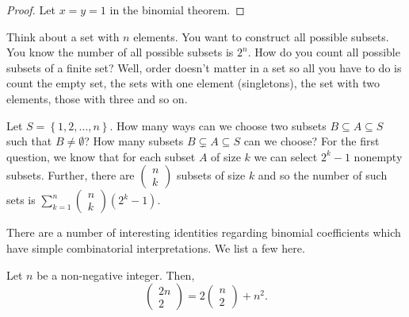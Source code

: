 \begin{proof}
Let $x=y=1$ in the binomial theorem.
\end{proof}
\begin{rem*}
Think about a set with $n$ elements. You want to construct all possible
subsets. You know the number of all possible subsets is $2^{n}$.
How do you count all possible subsets of a finite set? Well, order
doesn't matter in a set so all you have to do is count the empty set,
the sets with one element (singletons), the set with two elements,
those with three and so on.
\end{rem*}
\begin{example}
\label{exa:isi2013psb3}Let $S=\left\{ 1,2,\ldots,n\right\} .$ How
many ways can we choose two subsets $B\subseteq A\subseteq S$ such
that $B\neq\emptyset$? How many subsets $B\subsetneq A\subseteq S$
can we choose? For the first question, we know that for each subset
$A$ of size $k$ we can select $2^{k}-1$ nonempty subsets. Further,
there are $\left(\begin{array}{c}
n\\
k
\end{array}\right)$ subsets of size $k$ and so the number of such sets is $\sum_{k=1}^{n}\left(\begin{array}{c}
n\\
k
\end{array}\right)\left(2^{k}-1\right)$.
\end{example}

There are a number of interesting identities regarding binomial coefficients
which have simple combinatorial interpretations. We list a few here.
\begin{prop}
\label{prop:mdmActivity94}Let $n$ be a non-negative integer. Then,
\[
\left(\begin{array}{c}
2n\\
2
\end{array}\right)=2\left(\begin{array}{c}
n\\
2
\end{array}\right)+n^{2}.
\]
\end{prop}

